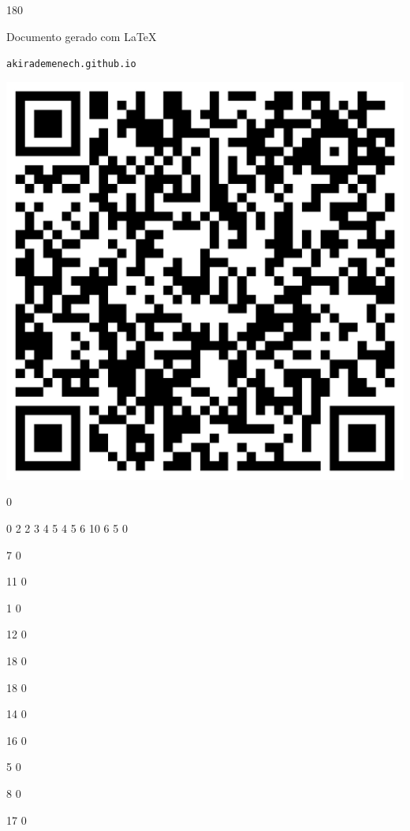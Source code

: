 \documentclass[12pt]{article}
\begin{document}
	\begin{turn}{180}	
		\begin{minipage}{\textwidth}		  
		  Documento gerado com \LaTeX			
		  
		  \texttt{akirademenech.github.io}

		  \includegraphics[height=0.3\textheight]{2e-2.pdf}

		\end{minipage}	
	\end{turn}  
		  
		\vfill  
		  
{
	0	%

	0	%
	2	%
	2	%
	3	%
	4	%
	5	%
	4	%
	5	%
	6	%
	10	%
	6	%
	5	%
	0	%

	7	%
	0	%

	11	%
	0	%

	1	%
	0	%

	12	%
	0	%

	18	%
	0	%

	18	%
	0	%

	14	%
	0	%

	16	%
	0	%

	5	%
	0	%

	8	%
	0	%

	17	%
	0	%

}	  
		    	
\end{document}
